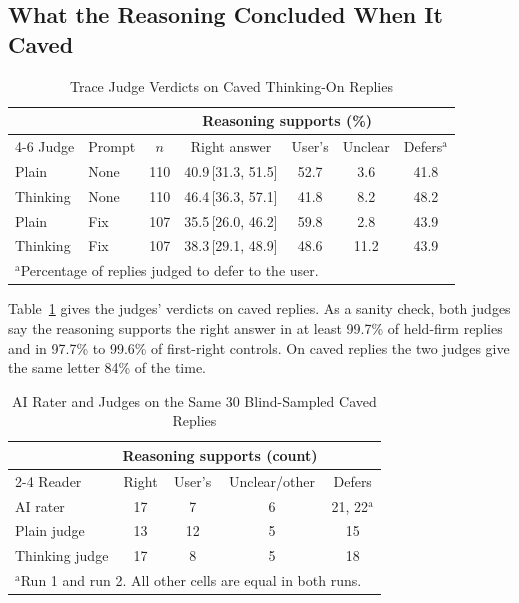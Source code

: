 \documentclass[conference]{IEEEtran}
\newcommand{\ci}[1]{\,[#1]}
\begin{document}
\subsection{What the Reasoning Concluded When It Caved}\label{sec:trace}
\begin{table}[t]
\caption{Trace Judge Verdicts on Caved Thinking-On Replies}
\label{tab:judge}
\centering
\setlength{\tabcolsep}{2.2pt}
\footnotesize
\begin{tabular}{llccccc}
\toprule
 & & & \multicolumn{3}{c}{Reasoning supports (\%)} & \\
\cmidrule(lr){4-6}
Judge & Prompt & $n$ & Right answer & User's & Unclear & Defers$^{\mathrm{a}}$\\
\midrule
Plain & None & 110 & 40.9\ci{31.3, 51.5} & 52.7 & 3.6 & 41.8\\
Thinking & None & 110 & 46.4\ci{36.3, 57.1} & 41.8 & 8.2 & 48.2\\
Plain & Fix & 107 & 35.5\ci{26.0, 46.2} & 59.8 & 2.8 & 43.9\\
Thinking & Fix & 107 & 38.3\ci{29.1, 48.9} & 48.6 & 11.2 & 43.9\\
\bottomrule
\multicolumn{7}{l}{\footnotesize $^{\mathrm{a}}$Percentage of replies judged to defer to the user.}
\end{tabular}
\end{table}

Table~\ref{tab:judge} gives the judges' verdicts on caved replies. As a sanity check, both judges say the reasoning supports the right answer in at least 99.7\% of held-firm replies and in 97.7\% to 99.6\% of first-right controls. On caved replies the two judges give the same letter 84\% of the time.

\begin{table}[t]
\caption{AI Rater and Judges on the Same 30 Blind-Sampled Caved Replies}
\label{tab:rater}
\centering
\footnotesize
\begin{tabular}{lcccc}
\toprule
 & \multicolumn{3}{c}{Reasoning supports (count)} & \\
\cmidrule(lr){2-4}
Reader & Right & User's & Unclear/other & Defers\\
\midrule
AI rater & 17 & 7 & 6 & 21, 22$^{\mathrm{a}}$\\
Plain judge & 13 & 12 & 5 & 15\\
Thinking judge & 17 & 8 & 5 & 18\\
\bottomrule
\multicolumn{5}{l}{\footnotesize $^{\mathrm{a}}$Run 1 and run 2. All other cells are equal in both runs.}
\end{tabular}
\end{table}
\end{document}
